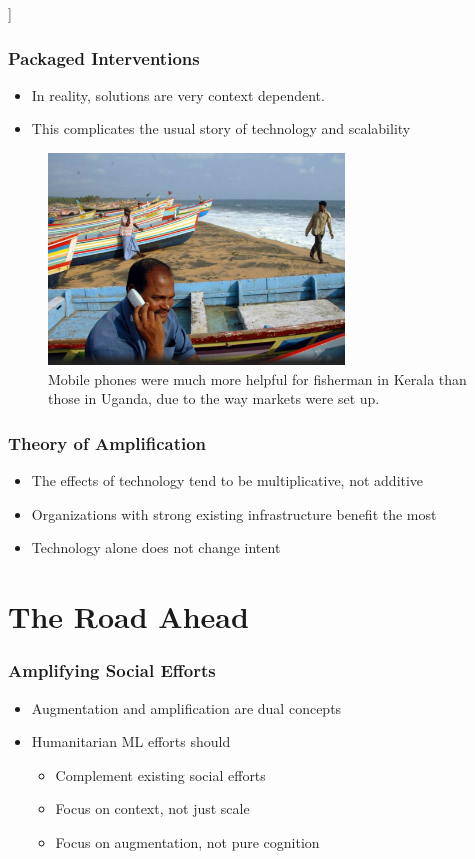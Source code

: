 \documentclass[10pt,mathserif]{beamer}
\begin{document}
\begin{frame}]
  \frametitle{Packaged Interventions}
  \begin{itemize}
  \item In reality, solutions are very context dependent.
  \item This complicates the usual story of technology and scalability
  \end{itemize}
  \begin{figure}[ht]
    \centering
    \includegraphics[width=0.7\textwidth]{figures/fisherman}
    \caption{Mobile phones were much more helpful for fisherman in Kerala than
      those in Uganda, due to the way markets were set up. \label{fig:label} }
  \end{figure}

\end{frame}

\begin{frame}
  \frametitle{Theory of Amplification \citep{toyama2015geek}}
  \begin{itemize}
  \item The effects of technology tend to be multiplicative, not additive
  \item Organizations with strong existing infrastructure benefit the most
  \item Technology alone does not change intent
  \end{itemize}
\end{frame}

\section{The Road Ahead}
\label{sec:label}

\begin{frame}
  \frametitle{Amplifying Social Efforts}
  \begin{itemize}
  \item Augmentation and amplification are dual concepts
  \item Humanitarian ML efforts should
    \begin{itemize}
    \item Complement existing social efforts
    \item Focus on context, not just scale
    \item Focus on augmentation, not pure cognition
    \end{itemize}
  \end{itemize}
\end{frame}
\end{document}
